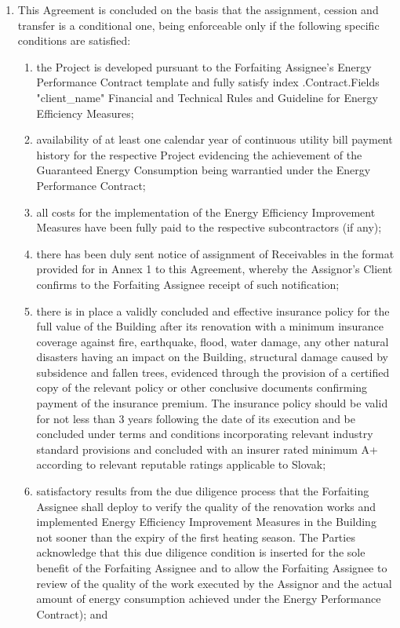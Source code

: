 \documentclass[a4paper]{article}
\begin{document}
\begin{enumerate}
\item{This Agreement is concluded on the basis that the assignment,
    cession and transfer is a conditional one, being enforceable only
    if the following specific conditions are satisfied:}

  \begin{enumerate}
  \item{the Project is developed pursuant to the Forfaiting Assignee’s
      Energy Performance Contract template and fully satisfy {{index .Contract.Fields "client_name"}}
      Financial and Technical Rules and Guideline for Energy
      Efficiency Measures;}

  \item{availability of at least one calendar year of continuous
      utility bill payment history for the respective Project
      evidencing the achievement of the Guaranteed Energy Consumption
      being warrantied under the Energy Performance Contract;}

  \item{all costs for the implementation of the Energy Efficiency
      Improvement Measures have been fully paid to the respective
      subcontractors (if any);}

  \item{there has been duly sent notice of assignment of Receivables
      in the format provided for in Annex 1 to this Agreement, whereby
      the Assignor’s Client confirms to the Forfaiting Assignee
      receipt of such notification;}

  \item{there is in place a validly concluded and effective insurance
      policy for the full value of the Building after its renovation
      with a minimum insurance coverage against fire, earthquake,
      flood, water damage, any other natural disasters having an
      impact on the Building, structural damage caused by subsidence
      and fallen trees, evidenced through the provision of a certified
      copy of the relevant policy or other conclusive documents
      confirming payment of the insurance premium. The insurance
      policy should be valid for not less than 3 years following the
      date of its execution and be concluded under terms and
      conditions incorporating relevant industry standard provisions
      and concluded with an insurer rated minimum A+ according to
      relevant reputable ratings applicable to Slovak;}

  \item{satisfactory results from the due diligence process that the
      Forfaiting Assignee shall deploy to verify the quality of the
      renovation works and implemented Energy Efficiency Improvement
      Measures in the Building not sooner than the expiry of the first
      heating season. The Parties acknowledge that this due diligence
      condition is inserted for the sole benefit of the Forfaiting
      Assignee and to allow the Forfaiting Assignee to review of the
      quality of the work executed by the Assignor and the actual
      amount of energy consumption achieved under the Energy
      Performance Contract); and}


\end{enumerate}
\end{enumerate}
\end{document}
